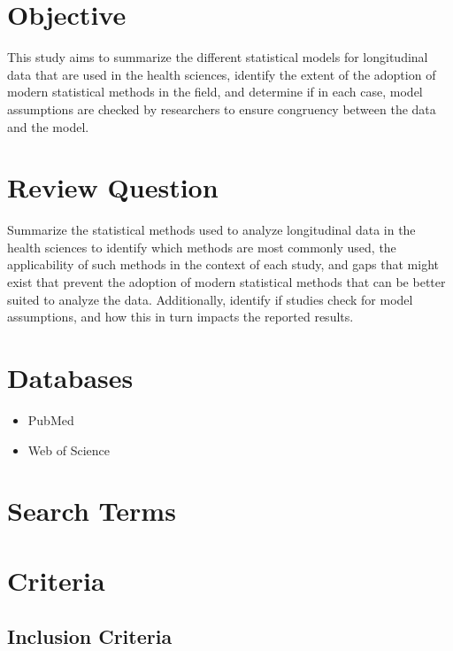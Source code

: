 \documentclass[
]{article}
\providecommand{\tightlist}{%
  \setlength{\itemsep}{0pt}\setlength{\parskip}{0pt}}\usepackage{longtable,booktabs,array}
\begin{document}
\hypertarget{objective}{%
\section{Objective}\label{objective}}

This study aims to summarize the different statistical models for
longitudinal data that are used in the health sciences, identify the
extent of the adoption of modern statistical methods in the field, and
determine if in each case, model assumptions are checked by researchers
to ensure congruency between the data and the model.

\hypertarget{review-question}{%
\section{Review Question}\label{review-question}}

Summarize the statistical methods used to analyze longitudinal data in
the health sciences to identify which methods are most commonly used,
the applicability of such methods in the context of each study, and gaps
that might exist that prevent the adoption of modern statistical methods
that can be better suited to analyze the data. Additionally, identify if
studies check for model assumptions, and how this in turn impacts the
reported results.

\hypertarget{databases}{%
\section{Databases}\label{databases}}

\begin{itemize}
\tightlist
\item
  PubMed
\item
  Web of Science
\end{itemize}

\hypertarget{search-terms}{%
\section{Search Terms}\label{search-terms}}

\hypertarget{criteria}{%
\section{Criteria}\label{criteria}}

\hypertarget{inclusion-criteria}{%
\subsection{Inclusion Criteria}\label{inclusion-criteria}}
\end{document}

